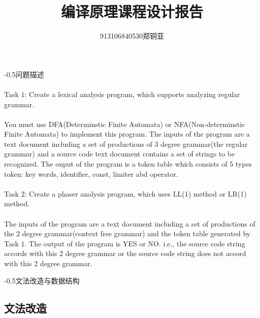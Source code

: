 \documentclass[UTF8]{ctexart}
\author{913106840530郑铜亚}
\title{编译原理课程设计报告}
\makeatletter
\renewcommand{\section}{\@startsection{section}{1}{0mm}
	{-\baselineskip}{0.5\baselineskip}{\bf\leftline}}
\makeatother
\begin{document}
	\maketitle
	\newpage
	
	\section{问题描述} %
	\label{sec:probelm_descrption}
	\paragraph{} %
	Task $1$: Create a lexical analysis program,
	which supports analyzing regular grammar.
	\paragraph{} %
	You must use DFA(Determinstic Finite Automata) or
	NFA(Non-determinstic Finite Automata) to implement
	this program. The inputs of the program are a text
	document including a set of productions of 3 degree
	grammar(the regular grammar) and a source code text
	document contains a set of strings to be recognized.
	The ouput of the program is a token table which 
	consists of 5 types token: key words, identifier, 
	const, limiter abd operator.
	\paragraph{} %
	Task $2$: Create a phaser analysis program, which 
	uses LL(1) method or LR(1) method.
	\paragraph{} %
	The inputs of the program are a text document including
	a set of productions of the 2 degree grammar(context free
	grammar) and the token table generated by Task $1$. The 
	output of the program is YES or NO. i.e., the source code
	string accords with this 2 degree grammar or the source code
	string does not accord with this 2 degree grammar.
	
	\section{文法改造与数据结构} %
	\label{sec:grammar_modify_and_data_structure}
	\subsection{文法改造} %
	\label{sub:grammar_modify}
\end{document}
